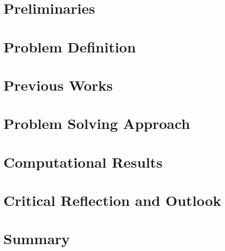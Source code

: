 \documentclass[a4paper,11pt,twoside]{memoir}
\begin{document}
\chapter{Preliminaries}
\label{ch:prelim}


\chapter{Problem Definition}
\label{ch:problem}


\chapter{Previous Works}
\label{ch:previous}


\chapter{Problem Solving Approach}
\label{ch:approach}


\chapter{Computational Results}
\label{ch:results}


\chapter{Critical Reflection and Outlook}
\label{ch:outlook}


\chapter{Summary}
\label{ch:summary}





\nocite{gebhard-12}
\nocite{fritz-11}
\nocite{leitner-06}

\appendix



\end{document}
